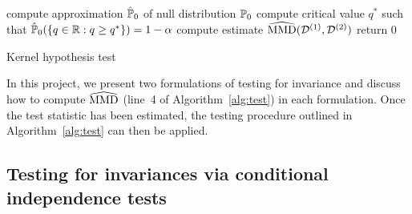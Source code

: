 \begin{algorithm}[h]
\SetAlgoLined
{}
\BlankLine
compute approximation $\hat{\P}_0$ of null distribution $\P_0$\;
compute critical value $q^*$ such that $\hat{\P}_0(\{q\in\bbR:q\geq q^*\})=1-\alpha$\;
compute estimate $\hatMMD(\calD^{(1)},\calD^{(2)})$\;
return 0\;
\caption{Kernel hypothesis test}
\label{alg:test}
\end{algorithm}

In this project, we present two formulations of testing for invariance and discuss how to compute $\hatMMD$ (line~4 of Algorithm~\ref{alg:test}) in each formulation. Once the test statistic has been estimated, the testing procedure outlined in Algorithm~\ref{alg:test} can then be applied.


\subsection{Testing for invariances via conditional independence tests} \label{sec:condind}


